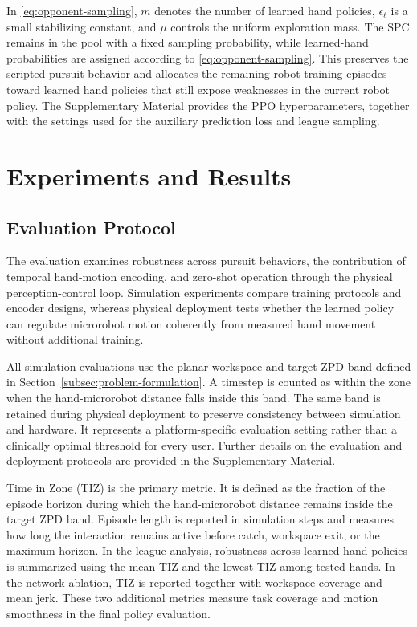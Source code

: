 \documentclass[journal,twoside,web]{ieeecolor2}
\begin{document}
In \eqref{eq:opponent-sampling}, $m$ denotes the number of learned hand policies, $\epsilon_{\ell}$ is a small stabilizing constant, and $\mu$ controls the uniform exploration mass. The SPC remains in the pool with a fixed sampling probability, while learned-hand probabilities are assigned according to \eqref{eq:opponent-sampling}. This preserves the scripted pursuit behavior and allocates the remaining robot-training episodes toward learned hand policies that still expose weaknesses in the current robot policy. The Supplementary Material provides the PPO hyperparameters, together with the settings used for the auxiliary prediction loss and league sampling.

\section{Experiments and Results}
\label{sec:experiments-results}

\subsection{Evaluation Protocol}
\label{subsec:simulation-protocol}
The evaluation examines robustness across pursuit behaviors, the contribution of temporal hand-motion encoding, and zero-shot operation through the physical perception-control loop. Simulation experiments compare training protocols and encoder designs, whereas physical deployment tests whether the learned policy can regulate microrobot motion coherently from measured hand movement without additional training.

All simulation evaluations use the planar workspace and target ZPD band defined in Section~\ref{subsec:problem-formulation}. A timestep is counted as within the zone when the hand-microrobot distance falls inside this band. The same band is retained during physical deployment to preserve consistency between simulation and hardware. It represents a platform-specific evaluation setting rather than a clinically optimal threshold for every user. Further details on the evaluation and deployment protocols are provided in the Supplementary Material.

Time in Zone (TIZ) is the primary metric. It is defined as the fraction of the episode horizon during which the hand-microrobot distance remains inside the target ZPD band. Episode length is reported in simulation steps and measures how long the interaction remains active before catch, workspace exit, or the maximum horizon. In the league analysis, robustness across learned hand policies is summarized using the mean TIZ and the lowest TIZ among tested hands. In the network ablation, TIZ is reported together with workspace coverage and mean jerk. These two additional metrics measure task coverage and motion smoothness in the final policy evaluation.
\end{document}
